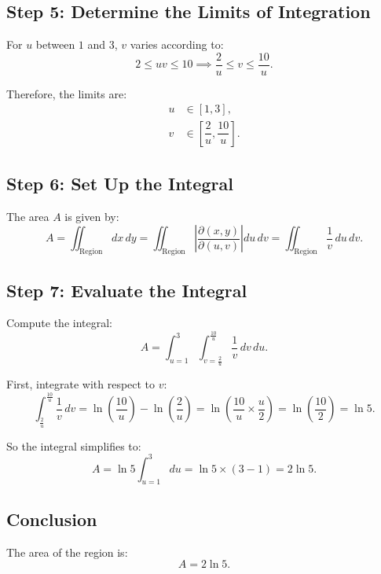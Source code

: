 \documentclass[11pt]{article}
\begin{document}
\newpage

\subsection{Step 5: Determine the Limits of Integration}

For \( u \) between \( 1 \) and \( 3 \), \( v \) varies according to:
\[
2 \leq u v \leq 10 \implies \frac{2}{u} \leq v \leq \frac{10}{u}.
\]

Therefore, the limits are:
\[
\begin{aligned}
u &\in [1, 3], \\
v &\in \left[ \dfrac{2}{u}, \dfrac{10}{u} \right].
\end{aligned}
\]

\newpage

\subsection{Step 6: Set Up the Integral}

The area \( A \) is given by:
\[
A = \iint_{\text{Region}} dx \, dy = \iint_{\text{Region}} \left| \dfrac{\partial(x, y)}{\partial(u, v)} \right| du \, dv = \iint_{\text{Region}} \dfrac{1}{v} \, du \, dv.
\]

\newpage

\subsection{Step 7: Evaluate the Integral}

Compute the integral:
\[
A = \int_{u=1}^{3} \int_{v=\frac{2}{u}}^{\frac{10}{u}} \dfrac{1}{v} \, dv \, du.
\]

First, integrate with respect to \( v \):
\[
\int_{\frac{2}{u}}^{\frac{10}{u}} \dfrac{1}{v} \, dv = \ln\left( \dfrac{10}{u} \right) - \ln\left( \dfrac{2}{u} \right) = \ln\left( \dfrac{10}{u} \times \dfrac{u}{2} \right) = \ln\left( \dfrac{10}{2} \right) = \ln 5.
\]

So the integral simplifies to:
\[
A = \ln 5 \int_{u=1}^{3} du = \ln 5 \times (3 - 1) = 2 \ln 5.
\]

\newpage

\subsection{Conclusion}

The area of the region is:
\[
A = 2 \ln 5.
\]
\end{document}
